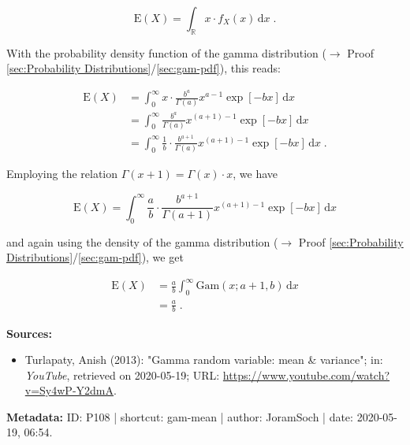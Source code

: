 \documentclass[a4paper,12pt,twoside]{book}
\begin{document}
\begin{equation} \label{eq:gam-mean-mean}
\mathrm{E}(X) = \int_{\mathbb{R}} x \cdot f_X(x) \, \mathrm{d}x \; .
\end{equation}

With the probability density function of the gamma distribution ($\rightarrow$ Proof \ref{sec:Probability Distributions}/\ref{sec:gam-pdf}), this reads:

\begin{equation} \label{eq:gam-mean-gam-mean-s1}
\begin{split}
\mathrm{E}(X) &= \int_{0}^{\infty} x \cdot \frac{b^a}{\Gamma(a)} x^{a-1} \exp[-b x] \, \mathrm{d}x \\
&= \int_{0}^{\infty} \frac{b^a}{\Gamma(a)} x^{(a+1)-1} \exp[-b x] \, \mathrm{d}x \\
&= \int_{0}^{\infty} \frac{1}{b} \cdot \frac{b^{a+1}}{\Gamma(a)} x^{(a+1)-1} \exp[-b x] \, \mathrm{d}x \; .
\end{split}
\end{equation}

Employing the relation $\Gamma(x+1) = \Gamma(x) \cdot x$, we have

\begin{equation} \label{eq:gam-mean-gam-mean-s2}
\mathrm{E}(X) = \int_{0}^{\infty} \frac{a}{b} \cdot \frac{b^{a+1}}{\Gamma(a+1)} x^{(a+1)-1} \exp[-b x] \, \mathrm{d}x
\end{equation}

and again using the density of the gamma distribution ($\rightarrow$ Proof \ref{sec:Probability Distributions}/\ref{sec:gam-pdf}), we get

\begin{equation} \label{eq:gam-mean-gam-mean-s3}
\begin{split}
\mathrm{E}(X) &= \frac{a}{b} \int_{0}^{\infty} \mathrm{Gam}(x; a+1, b) \, \mathrm{d}x \\
&= \frac{a}{b} \; .
\end{split}
\end{equation}


\vspace{1em}
\textbf{Sources:}
\begin{itemize}
\item Turlapaty, Anish (2013): "Gamma random variable: mean \& variance"; in: \textit{YouTube}, retrieved on 2020-05-19; URL: \url{https://www.youtube.com/watch?v=Sy4wP-Y2dmA}.
\end{itemize}


\vspace{1em}
\textbf{Metadata:} ID: P108 | shortcut: gam-mean | author: JoramSoch | date: 2020-05-19, 06:54.
\vspace{1em}
\end{document}
